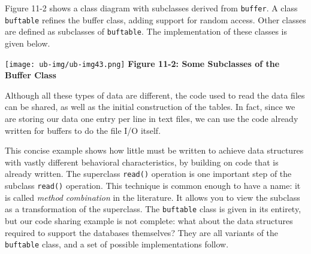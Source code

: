 Figure 11-2 shows a class diagram with subclasses derived from
\texttt{buffer}. A class \texttt{buftable} refines the
buffer class, adding support for random access. Other classes are
defined as subclasses of \texttt{buftable}. The implementation of these
classes is given below.


\begin{center}
\texttt{[image: ub-img/ub-img43.png]}
\linebreak
{\sffamily\bfseries Figure 11-2: Some Subclasses of the Buffer Class}
\end{center}

\bigskip

Although all these types of data are different, the code used to read
the data files can be shared, as well as the initial construction of
the tables. In fact, since we are storing our data one entry per line
in text files, we can use the code already written for buffers to do
the file I/O itself.


This concise example shows how little must be written to achieve data
structures with vastly different behavioral characteristics, by
building on code that is already written. The superclass
\texttt{read()} operation is one important step of the subclass
\texttt{read()} operation. This technique is common enough to have a
name: it is called \textit{method
}\textit{combination} in the literature. It
allows you to view the subclass as a transformation of the superclass.
The \texttt{buftable} class is given in its entirety, but our code
sharing example is not complete: what about the data structures
required to support the databases themselves? They are all variants of
the \texttt{buftable} class, and a set of possible implementations
follow.

